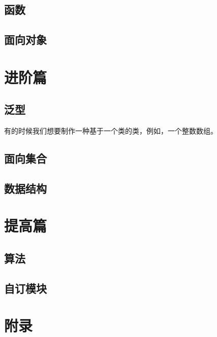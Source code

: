 \documentclass{tufte-book}
\renewcommand{\thepart}{第\CJKnumber{\arabic{part}}部分}
\begin{document}
	\chapter{函数}
	\chapter{面向对象}
	
\part{进阶篇}
	\chapter{泛型}
		有的时候我们想要制作一种基于一个类的类，例如，一个整数数组。
		
	\chapter{面向集合}
	\chapter{数据结构}
	
\part{提高篇}
	\chapter{算法}
	\chapter{自订模块}
	
\renewcommand{\thepart}{}

\part{附录}
	\printindex
	
\newpage
\end{document}
